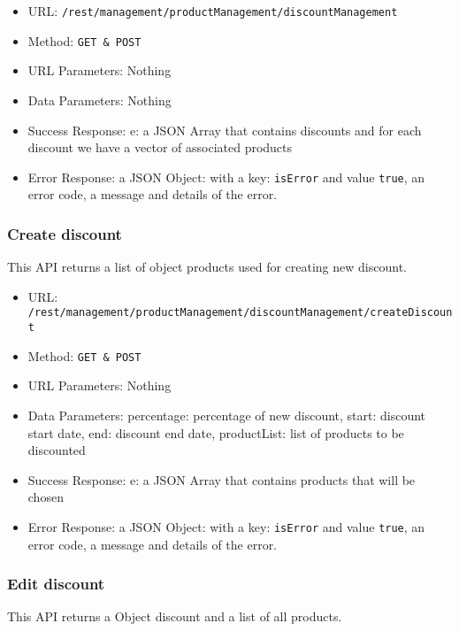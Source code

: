 \begin{itemize}
    \item URL: \texttt{/rest/management/productManagement/discountManagement}
    \item Method: \texttt{{GET \& POST}}
    \item URL Parameters: Nothing
    \item Data Parameters: Nothing
    \item Success Response: e: a JSON Array that contains discounts and for each discount we have a vector of associated products
    \item Error Response: a JSON Object: with a key: \texttt{isError}  and value \texttt{true}, an error code, a message and details of the error.
\end{itemize}

\subsubsection*{Create discount}
This API returns a list of object products used for creating new discount.

\begin{itemize}
    \item URL: \texttt{/rest/management/productManagement/discountManagement/createDiscount}
    \item Method: \texttt{{GET \& POST}}
    \item URL Parameters: Nothing
    \item Data Parameters: percentage: percentage of new discount, start: discount start date, end: discount end date, productList: list of products to be discounted
    \item Success Response: e: a JSON Array that contains products that will be chosen
    \item Error Response: a JSON Object: with a key: \texttt{isError}  and value \texttt{true}, an error code, a message and details of the error.
\end{itemize}

\subsubsection*{Edit discount}
This API returns a Object discount and a list of all products.


